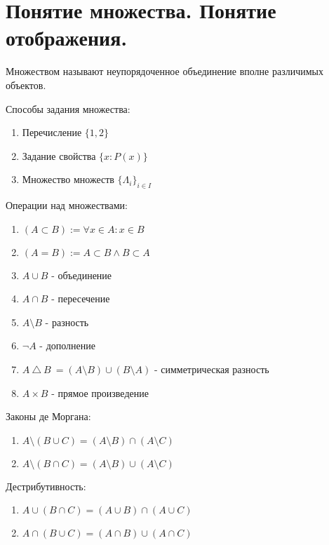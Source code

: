 \documentclass[calculus]{subfiles}
\begin{document}
    \section{Понятие множества. Понятие отображения.}\label{sec:part-1}

    \begin{definition}[Множество]
        Множеством называют неупорядоченное объединение вполне различимых объектов.
    \end{definition}

    \bigskip

    Способы задания множества:
    \begin{enumerate}
        \item Перечисление \(\{1, 2\}\)
        \item Задание свойства \(\{x : P(x)\}\)
        \item Множество множеств \(\{\Lambda_i\}_{i \in I}\)
    \end{enumerate}

    \bigskip

    Операции над множествами:
    \begin{enumerate}
        \item \((A \subset B) := \forall x \in A : x \in B \)
        \item \((A = B) := A \subset B \land B \subset A\)
        \item \(A \cup B\) - объединение
        \item \(A \cap B\) - пересечение
        \item \(A \setminus B\) - разность
        \item \(\neg A\) - дополнение
        \item \(A \  \triangle \  B\ = (A \setminus B) \cup (B \setminus A) \) - симметрическая разность
        \item \(A \times B\) - прямое произведение
    \end{enumerate}

    \bigskip

    Законы де Моргана:
    \begin{enumerate}
        \item \(A \setminus (B \cup C) = (A \setminus B) \cap (A \setminus C)\)
        \item \(A \setminus (B \cap C) = (A \setminus B) \cup (A \setminus C)\)
    \end{enumerate}

    \bigskip

    Дестрибутивность:
    \begin{enumerate}
        \item \(A \cup (B \cap C) = (A \cup B) \cap (A \cup C) \)
        \item \(A \cap (B \cup C) = (A \cap B) \cup (A \cap C) \)
    \end{enumerate}
\end{document}

